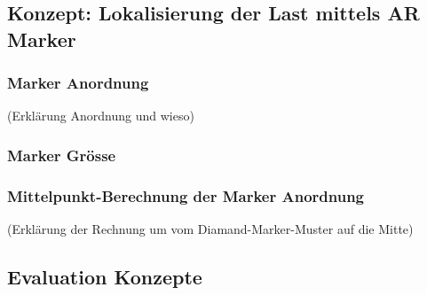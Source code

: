 \subsection{Konzept: Lokalisierung der Last mittels AR Marker}

\subsubsection{Marker Anordnung}
(Erklärung Anordnung und wieso)
\subsubsection{Marker Grösse}
\subsubsection{Mittelpunkt-Berechnung der Marker Anordnung}
(Erklärung der Rechnung um vom Diamand-Marker-Muster auf die Mitte) 

\subsection{Evaluation Konzepte}

